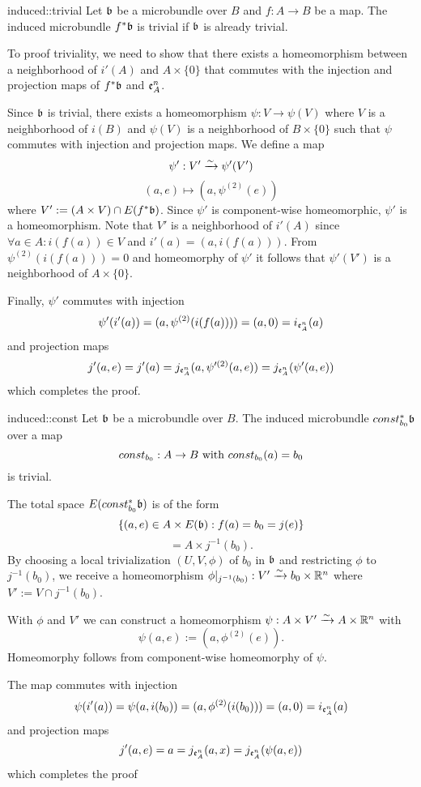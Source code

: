 \begin{mylemma}{induced::trivial}
    Let $\mathfrak{b}$ be a microbundle over $B$ and $f: A \to B$ be a map.
    The induced microbundle $f^*\mathfrak{b}$ is trivial if $\mathfrak{b}$ is already trivial.
\end{mylemma}

\begin{myproof}
    To proof triviality, we need to show that there exists a homeomorphism between a neighborhood of $i'(A)$ and $A \times \{0\}$
    that commutes with the injection and projection maps of $f^*\mathfrak{b}$ and $\mathfrak{e}^{n}_A$.
    
    Since $\mathfrak{b}$ is trivial, there exists a homeomorphism $\psi: V \to \psi(V)$
    where $V$ is a neighborhood of $i(B)$ and $\psi(V)$ is a neighborhood of $B \times \{0\}$
    such that $\psi$ commutes with injection and projection maps.
    We define a map 
    \[ \psi': V' \xrightarrow{\sim} \psi'(V') \]
    \[ (a, e) \mapsto (a, \psi^{(2)}(e)) \]
    where $V' := (A \times V) \cap E(f^*\mathfrak{b})$.
    Since $\psi'$ is component-wise homeomorphic, $\psi'$ is a homeomorphism.
    Note that $V'$ is a neighborhood of $i'(A)$ since $\forall a \in A: i(f(a)) \in V$ and $i'(a) = (a, i(f(a)))$.
    From $\psi^{(2)}(i(f(a))) = 0$ and homeomorphy of $\psi'$ it follows that $\psi'(V')$ is a neighborhood of $A \times \{0\}$.

    Finally, $\psi'$ commutes with injection
    \[ \psi'(i'(a)) = (a, \psi^{(2)}(i(f(a)))) = (a, 0) = i_{\mathfrak{e}^{n}_A}(a) \]
    and projection maps
    \[ j'(a, e) = j'(a) = j_{\mathfrak{e}^{n}_A}(a, \psi'^{(2)}(a, e)) = j_{\mathfrak{e}^{n}_A}(\psi'(a, e)) \]
    which completes the proof.
\end{myproof}

\begin{mylemma}{induced::const}
    Let $\mathfrak{b}$ be a microbundle over $B$. The induced microbundle $const_{b_0}^*\mathfrak{b}$ over a map
    \[ const_{b_0}: A \to B \text{ with } const_{b_0}(a) = b_0 \]
    is trivial.
\end{mylemma}

\begin{myproof}
    The total space $E(const_{b_0}^*\mathfrak{b})$ is of the form
    \[ \{(a, e) \in A \times E(\mathfrak{b}):f(a) = b_0 = j(e)\} \]
    \[ = A \times j^{-1}(b_0). \]
    By choosing a local trivialization $(U, V, \phi)$ of $b_0$ in $\mathfrak{b}$ and restricting $\phi$ to $j^{-1}(b_0)$,
    we receive a homeomorphism $\phi\vert_{j^{-1}(b_0)}: V' \xrightarrow{\sim} b_0 \times \mathbb{R}^n$ where $V' := V \cap j^{-1}(b_0)$.
    
    With $\phi$ and $V'$ we can construct a homeomorphism $\psi: A \times V' \xrightarrow{\sim} A \times \mathbb{R}^n$ with
    \[ \psi(a, e) := (a, \phi^{(2)}(e)). \]
    Homeomorphy follows from component-wise homeomorphy of $\psi$.

    The map commutes with injection
    \[ \psi(i'(a)) = \psi(a, i(b_0)) = (a, \phi^{(2)}(i(b_0))) = (a, 0) = i_{\mathfrak{e}^{n}_A}(a) \]
    and projection maps
    \[ j'(a, e) = a = j_{\mathfrak{e}^{n}_A}(a, x) = j_{\mathfrak{e}^{n}_A}(\psi(a, e)) \]
    which completes the proof
\end{myproof}